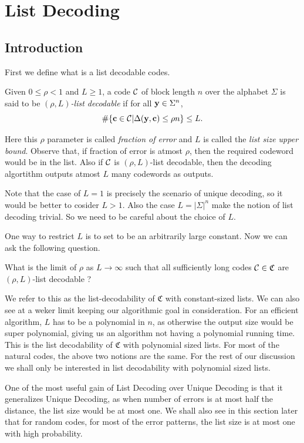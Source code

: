 \chapter{List Decoding}

\section{Introduction}
	First we define what is a list decodable codes.
	\begin{definition}[]
		Given $0 \leq \rho <1$ and $L\geq1$, a code $\mathcal{C}$ of block length $n$ over the alphabet $\Sigma$ is said to be $(\rho, L)$\emph{-list decodable} if for all $\mathbf{y}\in\Sigma^n$,
		\[
		\#\{\mathbf{c}\in\mathcal{C} | \Delta(\mathbf{y},\mathbf{c})\leq\rho n\} \leq L.
		\]
	\end{definition}	
	Here this $\rho$ parameter is called \emph{fraction of error} and $L$ is called the \emph{list size upper bound}. Observe that, if fraction of error is atmost $\rho$, then the required codeword would be in the list. Also if $\mathcal{C}$ is $(\rho, L)$-list decodable, then the decoding algortithm outputs atmost $L$ many codewords as outputs.
	
	Note that the case of $L=1$ is precisely the scenario of unique decoding, so it would be better to cosider $L>1$. Also the case $L=|\Sigma|^n$ make the notion of list decoding trivial. So we need to be careful about the choice of $L$.
	
	One way to restrict $L$ is to set to be an arbitrarily large constant. Now we can ask the following question.
	
	\begin{question}[]
		What is the limit of $\rho$ as $L\to\infty$ such that all sufficiently long codes $\mathcal{C}\in\mathfrak{C}$ are $(\rho, L)$-list decodable ?
	\end{question}
	We refer to this as the list-decodability of $\mathfrak{C}$ with constant-sized lists. We can also see at a weker limit keeping our algorithmic goal in consideration. For an efficient algorithm, $L$ has to be a polynomial in $n$, as otherwise the output size would be super polynomial, giving us an algorithm not having a polynomial running time. This is the list decodability of $\mathfrak{C}$ with polynomial sized lists. For most of the natural codes, the above two notions are the same. For the rest of our discussion we shall only be interested in list decodability with polynomial sized lists.
	
	One of the most useful gain of List Decoding over Unique Decoding is that it generalizes Unique Decoding, as when number of errors is at most half the distance, the list size would be at most one. We shall also see in this section later that for random codes, for most of the error patterns, the list size is at most one with high probability.
	
